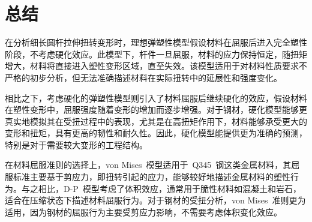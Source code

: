 \chapter{总结}
\label{cha:conclusion}
在分析细长圆杆拉伸扭转变形时，理想弹塑性模型假设材料在屈服后进入完全塑性阶段，不考虑硬化效应。此模型下，杆件一旦屈服，材料的应力保持恒定，随扭矩增大，材料将直接进入塑性变形区域，直至失效。该模型适用于对材料性质要求不严格的初步分析，但无法准确描述材料在实际扭转中的延展性和强度变化。

相比之下，考虑硬化的弹塑性模型则引入了材料屈服后继续硬化的效应，假设材料在塑性变形中，屈服强度随着变形的增加而逐步增强。对于钢材，硬化模型能够更真实地模拟其在受扭过程中的表现，尤其是在高扭矩作用下，材料能够承受更大的变形和扭矩，具有更高的韧性和耐久性。因此，硬化模型能提供更为准确的预测，特别是对于需要较大变形的工程结构\cite{Lemaitre1990}。

在材料屈服准则的选择上，von Mises~模型适用于~Q345~钢这类金属材料，其屈服标准主要基于剪应力，即扭转引起的应力，能够较好地描述金属材料的塑性行为。与之相比，D-P~模型考虑了体积效应，通常用于脆性材料如混凝土和岩石，适合在压缩状态下描述材料屈服行为。对于钢材的受扭分析，von Mises~准则更为适用，因为钢材的屈服行为主要受剪应力影响，不需要考虑体积变化效应\cite{Barrett2014}。